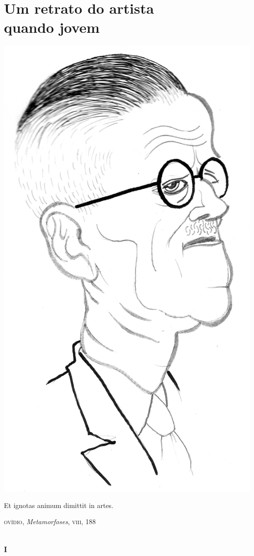 ﻿
\makeatletter
\renewcommand\@endpart{\vfil\clearpage}
\makeatother

\part[Um retrato do artista quando jovem]{Um retrato do artista\\ quando jovem}

\thispagestyle{empty}
\vspace*{\fill}
\begin{center}
\includegraphics[width=.6\textwidth]{joyce5.jpg}
\end{center}
\vspace*{\fill}

\clearpage

\vspace*{.5\textheight}
\thispagestyle{empty}

\epigraph{Et ignotas animum dimittit in artes.\footnotemark}{\textsc{ovídio}, \textit{Metamorfoses}, \textsc{viii}, 188}

\chapter{\textsc{i}}

